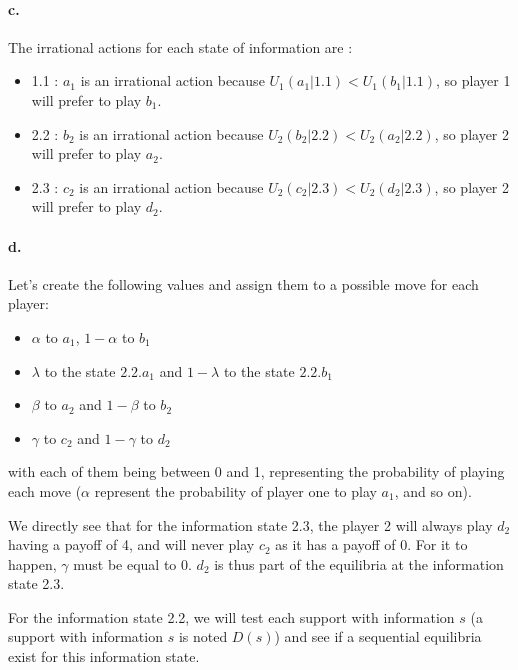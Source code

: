 \paragraph{c.}\label{parac} The irrational actions for each state of information are :

\begin{itemize}
\item 1.1 : $a_1$ is an irrational action because $U_1(a_1|1.1) < U_1(b_1|1.1)$, so player 1 will prefer to play $b_1$.
\item 2.2 : $b_2$ is an irrational action because $U_2(b_2|2.2) < U_2(a_2|2.2)$, so player 2 will prefer to play $a_2$.
\item 2.3 : $c_2$ is an irrational action because $U_2(c_2|2.3) < U_2(d_2|2.3)$, so player 2 will prefer to play $d_2$.
\end{itemize}

\paragraph{d.} Let's create the following values and assign them to a possible move for each player:

\begin{itemize}
    \item $\alpha$ to $a_1$, $1-\alpha$ to $b_1$
    \item $\lambda$ to the state $2.2.a_1$ and $1-\lambda$ to the state $2.2.b_1$
    \item $\beta$ to $a_2$ and $1-\beta$ to $b_2$
    \item $\gamma$ to $c_2$ and $1-\gamma$ to $d_2$
\end{itemize} 
with each of them being between 0 and 1, representing the probability of playing each move ($\alpha$ represent the probability of player one to play $a_1$, and so on).

We directly see that for the information state 2.3, the player 2 will always play $d_2$ having a payoff of 4, and will never play $c_2$ as it has a payoff of 0. For it to happen, $\gamma$ must be equal to 0. $d_2$ is thus part of the equilibria at the information state 2.3. 

For the information state 2.2, we will test each support with information $s$ (a support with information $s$ is noted $D(s)$) and see if a sequential equilibria exist for this information state. 


